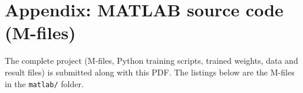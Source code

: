 \documentclass[9pt,a4paper]{extarticle}
\begin{document}
\thispagestyle{uct}
\section*{Appendix: MATLAB source code (M-files)}
The complete project (M-files, Python training scripts, trained weights, data and result files) is submitted along
with this PDF. The listings below are the M-files in the \texttt{matlab/} folder.

\end{document}
